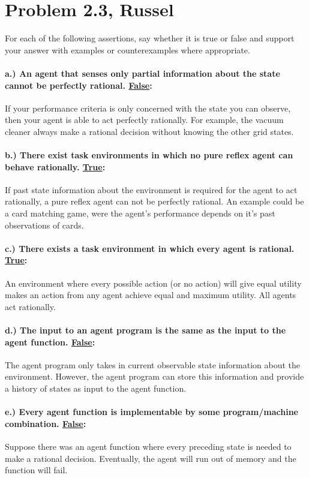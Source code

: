 \documentclass[12pt]{article}
\begin{document}
\section{Problem 2.3, Russel}
For each of the following assertions, say whether it is true or false and support your
answer with examples or counterexamples where appropriate.
\paragraph{a.) An agent that senses only partial information about the state cannot be perfectly rational. \underline{False}:}
If your performance criteria is only concerned with the state you can observe, then your agent is able to act perfectly rationally. For example, the vacuum cleaner always make a rational decision without knowing the other grid states.
\paragraph{b.) There exist task environments in which no pure reflex agent can behave rationally. \underline{True}:}
If past state information about the environment is required for the agent to act rationally, a pure reflex agent can not be perfectly rational. An example could be a card matching game, were the agent's performance depends on it's past observations of cards.
\paragraph{c.) There exists a task environment in which every agent is rational. \underline{True}:} An environment where every possible action (or no action) will give equal utility makes an action from any agent achieve equal and maximum utility. All agents act rationally.
\paragraph{d.) The input to an agent program is the same as the input to the agent function. \underline{False}:} The agent program only takes in current observable state information about the environment. However, the agent program can store this information and provide a history of states as input to the agent function.
\paragraph{e.) Every agent function is implementable by some program/machine combination. \underline{False}:} Suppose there was an agent function where every preceding state is needed to make a rational decision. Eventually, the agent will run out of memory and the function will fail.
\end{document}
